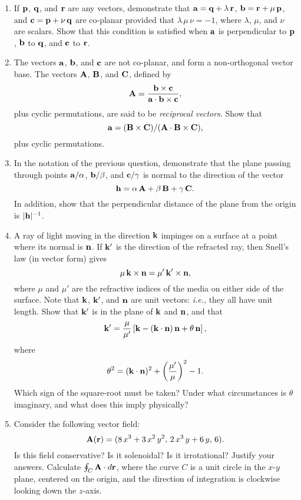 {\begin{enumerate}
\item If ${\bf p}$, ${\bf q}$, and ${\bf r}$ are any vectors, demonstrate that 
${\bf a}={\bf q} + \lambda\,{\bf r}$, ${\bf b} = {\bf r}+\mu\,{\bf p}$,
and ${\bf c} = {\bf p} + \nu\,{\bf q}$ are co-planar provided that
$\lambda\,\mu\,\nu=-1$, where $\lambda$, $\mu$, and $\nu$ are scalars.
Show that this condition is satisfied when ${\bf a}$ is perpendicular to ${\bf p}$, ${\bf b}$ to ${\bf q}$, and ${\bf c}$ to ${\bf r}$.

\item The vectors ${\bf a}$, ${\bf b}$, and ${\bf c}$ are not co-planar, and
form a non-orthogonal vector base. The vectors ${\bf A}$, ${\bf B}$,
and ${\bf C}$, defined by
$$
{\bf A} = \frac{{\bf b}\times {\bf c}}{{\bf a}\cdot{\bf b}\times {\bf c}},
$$
plus cyclic permutations, are said to be {\em reciprocal vectors}. Show that
 $$
 {\bf a} = ({\bf B}\times {\bf C})/({\bf A}\cdot{\bf B}\times {\bf C}),
 $$
plus cyclic permutations.

\item In the notation of the previous question, demonstrate that the plane passing
through points ${\bf a}/\alpha$, ${\bf b}/\beta$, and ${\bf c}/\gamma$
is normal to the direction of the vector
$$
{\bf h} = \alpha\,{\bf A} + \beta\,{\bf B} + \gamma\,{\bf C}.
$$
In addition, show that the perpendicular distance of the plane from the
origin is $|{\bf h}|^{-1}$.

\item A ray of light moving in the direction ${\bf k}$ impinges on a surface
at a point where its normal is ${\bf n}$. If ${\bf k}'$ is the direction
of the refracted ray, then Snell's law (in vector form) gives
$$
\mu\,{\bf k}\times {\bf n} = \mu'\,{\bf k}'\times {\bf n},
$$
where $\mu$ and $\mu'$ are the refractive indices of the media on either
side of the surface. Note that ${\bf k}$, ${\bf k}'$, and ${\bf n}$ are unit
vectors: {\em i.e.}, they all have unit length. 
Show that ${\bf k}'$ is in the plane of ${\bf k}$ and ${\bf n}$,
and that
$$
{\bf k} '= \frac{\mu}{\mu'}\left[{\bf k} - ({\bf k}\cdot{\bf n})\,{\bf n}+\theta\,{\bf n}\right],
$$
where
$$
\theta^2 = ({\bf k}\cdot{\bf n})^2 + \left(\frac{\mu'}{\mu}\right)^2 -1.
$$
Which
sign of the square-root must be taken? Under what circumstances is $\theta$
imaginary, and what does this imply physically?

\item Consider the following vector field:
$$
{\bf A}({\bf r}) = (8\,x^3+3\,x^2\,y^2,\,2\,x^3\,y+6\,y,\,6).
$$
Is this field conservative? Is it solenoidal? Is it irrotational? Justify your answers. Calculate $\oint_C {\bf A}\cdot d{\bf r}$, where the curve
$C$ is a unit circle in the $x$-$y$ plane, centered on the origin, and the
direction of integration is clockwise looking down the $z$-axis.


\end{enumerate}}
